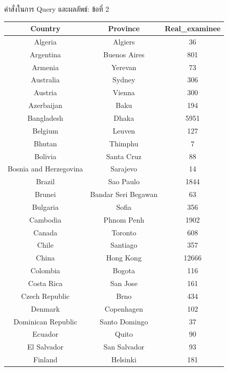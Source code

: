 \documentclass{beamer}
\begin{document}
\begin{frame}[fragile]{คำสั่งในการ Query และผลลัพธ์: ข้อที่ 2}
  \begin{tiny}
  \begin{table}
  \begin{tabular}{|c|c|c|}
  \hline
  \textbf{Country} & \textbf{Province} & \textbf{Real\_examinee} \\
  \hline
  Algeria & Algiers & 36 \\
  Argentina & Buenos Aires & 801 \\
  Armenia & Yerevan & 73 \\
  Australia & Sydney & 306 \\
  Austria & Vienna & 300 \\
  Azerbaijan & Baku & 194 \\
  Bangladesh & Dhaka & 5951 \\
  Belgium & Leuven & 127 \\
  Bhutan & Thimphu & 7 \\
  Bolivia & Santa Cruz & 88 \\
  Bosnia and Herzegovina & Sarajevo & 14 \\
  Brazil & Sao Paulo & 1844 \\
  Brunei & Bandar Seri Begawan & 63 \\
  Bulgaria & Sofia & 356 \\
  Cambodia & Phnom Penh & 1902 \\
  Canada & Toronto & 608 \\
  Chile & Santiago & 357 \\
  China & Hong Kong & 12666 \\
  Colombia & Bogota & 116 \\
  Costa Rica & San Jose & 161 \\
  Czech Republic & Brno & 434 \\
  Denmark & Copenhagen & 102 \\
  Dominican Republic & Santo Domingo & 37 \\
  Ecuador & Quito & 90 \\
  El Salvador & San Salvador & 93 \\
  Finland & Helsinki & 181 \\
  \hline
  \end{tabular}
  \end{table}
  \end{tiny}
\end{frame}
\end{document}
